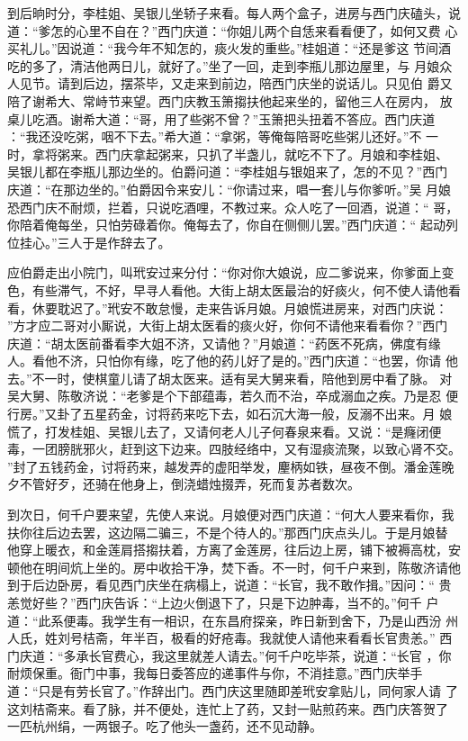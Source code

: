 到后晌时分，李桂姐、吴银儿坐轿子来看。每人两个盒子，进房与西门庆磕头，说
道：“爹怎的心里不自在？”西门庆道：“你姐儿两个自恁来看看便了，如何又费
心买礼儿。”因说道：“我今年不知怎的，痰火发的重些。”桂姐道：“还是爹这
节间酒吃的多了，清洁他两日儿，就好了。”坐了一回，走到李瓶儿那边屋里，与
月娘众人见节。请到后边，摆茶毕，又走来到前边，陪西门庆坐的说话儿。只见伯
爵又陪了谢希大、常峙节来望。西门庆教玉箫搊扶他起来坐的，留他三人在房内，
放桌儿吃酒。谢希大道：“哥，用了些粥不曾？”玉箫把头扭着不答应。西门庆道
：“我还没吃粥，咽不下去。”希大道：“拿粥，等俺每陪哥吃些粥儿还好。”不
一时，拿将粥来。西门庆拿起粥来，只扒了半盏儿，就吃不下了。月娘和李桂姐、
吴银儿都在李瓶儿那边坐的。伯爵问道：“李桂姐与银姐来了，怎的不见？”西门
庆道：“在那边坐的。”伯爵因令来安儿：“你请过来，唱一套儿与你爹听。”吴
月娘恐西门庆不耐烦，拦着，只说吃酒哩，不教过来。众人吃了一回酒，说道：“
哥，你陪着俺每坐，只怕劳碌着你。俺每去了，你自在侧侧儿罢。”西门庆道：“
起动列位挂心。”三人于是作辞去了。

应伯爵走出小院门，叫玳安过来分付：“你对你大娘说，应二爹说来，你爹面上变
色，有些滞气，不好，早寻人看他。大街上胡太医最治的好痰火，何不使人请他看
看，休要耽迟了。”玳安不敢怠慢，走来告诉月娘。月娘慌进房来，对西门庆说：
”方才应二哥对小厮说，大街上胡太医看的痰火好，你何不请他来看看你？”西门
庆道：“胡太医前番看李大姐不济，又请他？”月娘道：“药医不死病，佛度有缘
人。看他不济，只怕你有缘，吃了他的药儿好了是的。”西门庆道：“也罢，你请
他去。”不一时，使棋童儿请了胡太医来。适有吴大舅来看，陪他到房中看了脉。
对吴大舅、陈敬济说：“老爹是个下部蕴毒，若久而不治，卒成溺血之疾。乃是忍
便行房。”又卦了五星药金，讨将药来吃下去，如石沉大海一般，反溺不出来。月
娘慌了，打发桂姐、吴银儿去了，又请何老人儿子何春泉来看。又说：“是癃闭便
毒，一团膀胱邪火，赶到这下边来。四肢经络中，又有湿痰流聚，以致心肾不交。
”封了五钱药金，讨将药来，越发弄的虚阳举发，麈柄如铁，昼夜不倒。潘金莲晚
夕不管好歹，还骑在他身上，倒浇蜡烛掇弄，死而复苏者数次。

到次日，何千户要来望，先使人来说。月娘便对西门庆道：“何大人要来看你，我
扶你往后边去罢，这边隔二骗三，不是个待人的。”那西门庆点头儿。于是月娘替
他穿上暖衣，和金莲肩搭搊扶着，方离了金莲房，往后边上房，铺下被褥高枕，安
顿他在明间炕上坐的。房中收拾干净，焚下香。不一时，何千户来到，陈敬济请他
到于后边卧房，看见西门庆坐在病榻上，说道：“长官，我不敢作揖。”因问：“
贵恙觉好些？”西门庆告诉：“上边火倒退下了，只是下边肿毒，当不的。”何千
户道：“此系便毒。我学生有一相识，在东昌府探亲，昨日新到舍下，乃是山西汾
州人氏，姓刘号桔斋，年半百，极看的好疮毒。我就使人请他来看看长官贵恙。”
西门庆道：“多承长官费心，我这里就差人请去。”何千户吃毕茶，说道：“长官
，你耐烦保重。衙门中事，我每日委答应的递事件与你，不消挂意。”西门庆举手
道：“只是有劳长官了。”作辞出门。西门庆这里随即差玳安拿贴儿，同何家人请
了这刘桔斋来。看了脉，并不便处，连忙上了药，又封一贴煎药来。西门庆答贺了
一匹杭州绢，一两银子。吃了他头一盏药，还不见动静。

